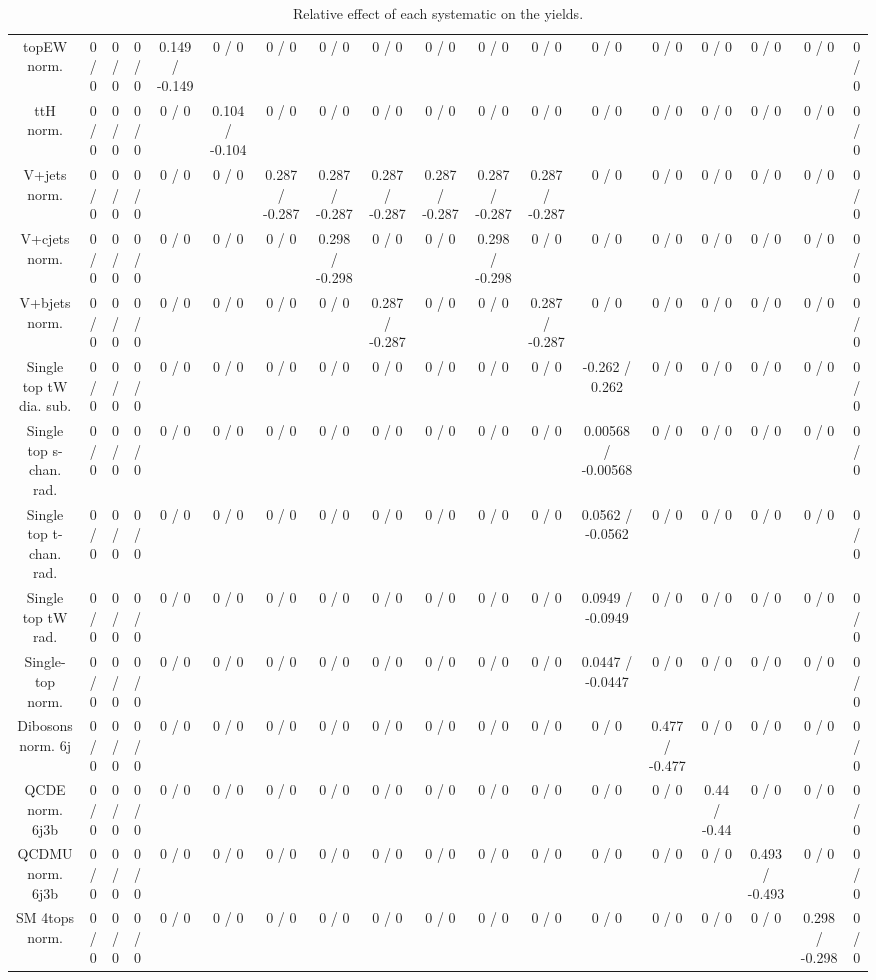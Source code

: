 \documentclass[10pt]{article}
\begin{document}
\begin{table}[htbp]
\begin{center}
\begin{tabular}{|c|c|c|c|c|c|c|c|c|c|c|c|c|c|c|c|c|c|}
  topEW norm. & 0 / 0 & 0 / 0 & 0 / 0 & 0.149 / -0.149 & 0 / 0 & 0 / 0 & 0 / 0 & 0 / 0 & 0 / 0 & 0 / 0 & 0 / 0 & 0 / 0 & 0 / 0 & 0 / 0 & 0 / 0 & 0 / 0 & 0 / 0 \\ 
  ttH norm. & 0 / 0 & 0 / 0 & 0 / 0 & 0 / 0 & 0.104 / -0.104 & 0 / 0 & 0 / 0 & 0 / 0 & 0 / 0 & 0 / 0 & 0 / 0 & 0 / 0 & 0 / 0 & 0 / 0 & 0 / 0 & 0 / 0 & 0 / 0 \\ 
  V+jets norm. & 0 / 0 & 0 / 0 & 0 / 0 & 0 / 0 & 0 / 0 & 0.287 / -0.287 & 0.287 / -0.287 & 0.287 / -0.287 & 0.287 / -0.287 & 0.287 / -0.287 & 0.287 / -0.287 & 0 / 0 & 0 / 0 & 0 / 0 & 0 / 0 & 0 / 0 & 0 / 0 \\ 
  V+cjets norm. & 0 / 0 & 0 / 0 & 0 / 0 & 0 / 0 & 0 / 0 & 0 / 0 & 0.298 / -0.298 & 0 / 0 & 0 / 0 & 0.298 / -0.298 & 0 / 0 & 0 / 0 & 0 / 0 & 0 / 0 & 0 / 0 & 0 / 0 & 0 / 0 \\ 
  V+bjets norm. & 0 / 0 & 0 / 0 & 0 / 0 & 0 / 0 & 0 / 0 & 0 / 0 & 0 / 0 & 0.287 / -0.287 & 0 / 0 & 0 / 0 & 0.287 / -0.287 & 0 / 0 & 0 / 0 & 0 / 0 & 0 / 0 & 0 / 0 & 0 / 0 \\ 
  Single top tW dia. sub. & 0 / 0 & 0 / 0 & 0 / 0 & 0 / 0 & 0 / 0 & 0 / 0 & 0 / 0 & 0 / 0 & 0 / 0 & 0 / 0 & 0 / 0 & -0.262 / 0.262 & 0 / 0 & 0 / 0 & 0 / 0 & 0 / 0 & 0 / 0 \\ 
  Single top s-chan. rad. & 0 / 0 & 0 / 0 & 0 / 0 & 0 / 0 & 0 / 0 & 0 / 0 & 0 / 0 & 0 / 0 & 0 / 0 & 0 / 0 & 0 / 0 & 0.00568 / -0.00568 & 0 / 0 & 0 / 0 & 0 / 0 & 0 / 0 & 0 / 0 \\ 
  Single top t-chan. rad. & 0 / 0 & 0 / 0 & 0 / 0 & 0 / 0 & 0 / 0 & 0 / 0 & 0 / 0 & 0 / 0 & 0 / 0 & 0 / 0 & 0 / 0 & 0.0562 / -0.0562 & 0 / 0 & 0 / 0 & 0 / 0 & 0 / 0 & 0 / 0 \\ 
  Single top tW rad. & 0 / 0 & 0 / 0 & 0 / 0 & 0 / 0 & 0 / 0 & 0 / 0 & 0 / 0 & 0 / 0 & 0 / 0 & 0 / 0 & 0 / 0 & 0.0949 / -0.0949 & 0 / 0 & 0 / 0 & 0 / 0 & 0 / 0 & 0 / 0 \\ 
  Single-top norm. & 0 / 0 & 0 / 0 & 0 / 0 & 0 / 0 & 0 / 0 & 0 / 0 & 0 / 0 & 0 / 0 & 0 / 0 & 0 / 0 & 0 / 0 & 0.0447 / -0.0447 & 0 / 0 & 0 / 0 & 0 / 0 & 0 / 0 & 0 / 0 \\ 
  Dibosons norm. 6j & 0 / 0 & 0 / 0 & 0 / 0 & 0 / 0 & 0 / 0 & 0 / 0 & 0 / 0 & 0 / 0 & 0 / 0 & 0 / 0 & 0 / 0 & 0 / 0 & 0.477 / -0.477 & 0 / 0 & 0 / 0 & 0 / 0 & 0 / 0 \\ 
  QCDE norm. 6j3b & 0 / 0 & 0 / 0 & 0 / 0 & 0 / 0 & 0 / 0 & 0 / 0 & 0 / 0 & 0 / 0 & 0 / 0 & 0 / 0 & 0 / 0 & 0 / 0 & 0 / 0 & 0.44 / -0.44 & 0 / 0 & 0 / 0 & 0 / 0 \\ 
  QCDMU norm. 6j3b & 0 / 0 & 0 / 0 & 0 / 0 & 0 / 0 & 0 / 0 & 0 / 0 & 0 / 0 & 0 / 0 & 0 / 0 & 0 / 0 & 0 / 0 & 0 / 0 & 0 / 0 & 0 / 0 & 0.493 / -0.493 & 0 / 0 & 0 / 0 \\ 
  SM 4tops norm. & 0 / 0 & 0 / 0 & 0 / 0 & 0 / 0 & 0 / 0 & 0 / 0 & 0 / 0 & 0 / 0 & 0 / 0 & 0 / 0 & 0 / 0 & 0 / 0 & 0 / 0 & 0 / 0 & 0 / 0 & 0.298 / -0.298 & 0 / 0 \\ 
\hline 
\end{tabular} 
\caption{Relative effect of each systematic on the yields.} 
\end{center} 
\end{table} 
\end{document}

